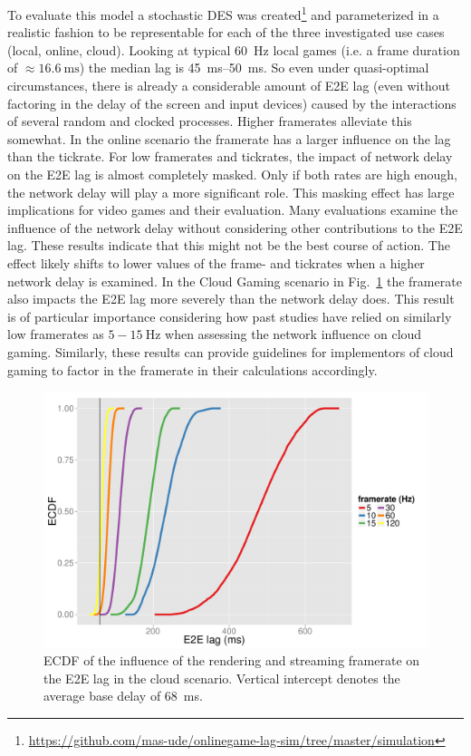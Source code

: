 To evaluate this model a stochastic \gls{DES} was created\footnote{\url{https://github.com/mas-ude/onlinegame-lag-sim/tree/master/simulation}} and parameterized in a realistic fashion to be representable for each of the three investigated use cases (local, online, cloud). Looking at typical \SI{60}{\hertz} local games (i.e. a frame duration of $\approx \SI{16.6}{\milli\second}$) the median lag is \SIrange{45}{50}{\milli\second}. So even under quasi-optimal circumstances, there is already a considerable amount of \gls{E2E} lag (even without factoring in the delay of the screen and input devices) caused by the interactions of several random and clocked processes. Higher framerates alleviate this somewhat. In the online scenario the framerate has a larger influence on the lag than the tickrate. For low framerates and tickrates, the impact of network delay on the \gls{E2E} lag is almost completely masked. Only if both rates are high enough, the network delay will play a more significant role. This masking effect has large implications for video games and their evaluation. Many evaluations examine the influence of the network delay without considering other contributions to the \gls{E2E} lag. These results indicate that this might not be the best course of action. The effect likely shifts to lower values of the frame- and tickrates when a higher network delay is examined. In the Cloud Gaming scenario in Fig.~\ref{fig:cloud-e2e-delay-sim} the framerate also impacts the \gls{E2E} lag more severely than the network delay does. This result is of particular importance considering how past studies have relied on similarly low framerates as $5-\SI{15}{\hertz}$ when assessing the network influence on cloud gaming. Similarly, these results can provide guidelines for implementors of cloud gaming to factor in the framerate in their calculations accordingly.

\begin{figure}[!t]
	\centering
	\includegraphics[width=1.0\columnwidth]{../../simulation/visualization/cloudgaming-lag-cdf.pdf}
	\caption{\acrshort{ECDF} of the influence of the rendering and streaming framerate on the \gls{E2E} lag in the cloud scenario. Vertical intercept denotes the average base delay of \SI{68}{\milli\second}.}
\label{fig:cloud-e2e-delay-sim}
\end{figure}


